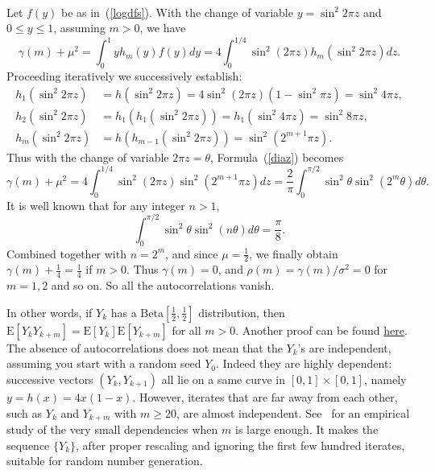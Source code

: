 \documentclass[oneside,10pt]{book}
\newenvironment{proof}[1][Proof]{\begin{trivlist}
\item[\hskip \labelsep {\bfseries #1}]}{\end{trivlist}}
\newcommand{\qed}{\nobreak \ifvmode \relax \else
      \ifdim\lastskip<1.5em \hskip-\lastskip
      \hskip1.5em plus0em minus0.5em \fi \nobreak
      \vrule height0.75em width0.5em depth0.25em\fi}
\begin{document}
\begin{proof} 
\quad \\
Let $f(y)$ be as in~(\ref{logdfs}). With the change of variable $y=\sin^2 2\pi z$ and $0\leq y\leq 1$, assuming $m>0$, we have
\begin{equation}
\gamma(m)+\mu^2 = \int_0^1 y h_m(y) f(y) dy = 4 \int_0^{1/4} \sin^2 (2\pi z) h_m(\sin^2 2\pi z) dz.\label{diaz}
\end{equation}
Proceeding iteratively we successively establish:
\begin{align}
h_1(\sin^2 2\pi z) & = h(\sin^2 2\pi z) = 4 \sin^2 (2\pi z) (1- \sin^2 \pi z) = \sin^2 4\pi z, \nonumber \\
h_2(\sin^2 2\pi z) & = h_1(h_1(\sin^2 2\pi z)) = h_1(\sin^2 4\pi z)= \sin^2 8\pi z, \nonumber \\
h_m(\sin^2 2\pi z) & = h(h_{m-1}(\sin^2 2\pi z)) = \sin^2(2^{m+1}\pi z). \nonumber
\end{align}
Thus with the change of variable $2\pi z=\theta$, Formula~(\ref{diaz}) becomes
$$
\gamma(m)+\mu^2 = 4 \int_0^{1/4} \sin^2 (2\pi z)\sin^2 (2^{m+1}\pi z)dz = \frac{2}{\pi}\int_0^{\pi/2}\sin^2\theta \sin^2 (2^m\theta)d\theta.
$$
It is well known that for any integer $n>1$, 
$$
\int_0^{\pi/2} \sin^2\theta \sin^2 (n \theta)d\theta =\frac{\pi}{8}.
$$
Combined together with $n=2^m$, and since $\mu=\frac{1}{2}$, we finally obtain
$\gamma(m)+\frac{1}{4} = \frac{1}{4}$ if $m>0$. Thus $\gamma(m)=0$, and $\rho(m)=\gamma(m)/\sigma^2=0$ for $m=1,2$ and so on. So all the autocorrelations vanish.
\qed
\end{proof}

In other words, if $Y_k$ has a $\text{Beta}[\frac{1}{2}, \frac{1}{2}]$ distribution, then $\text{E}[Y_k Y_{k+m}]=\text{E}[Y_k]\text{E}[Y_{k+m}]$ for all $m>0$. Another proof can be found \href{https://stats.stackexchange.com/questions/608109/autocorrelation-function-of-the-logistic-map-x-n1-4x-n1-x-n/}{here}.
The absence of autocorrelations does not mean that the $Y_k$'s are independent, assuming you start with a random seed $Y_0$.
 Indeed they are highly dependent: successive vectors $(Y_k,Y_{k+1})$ all lie on a same curve in $[0, 1]\times [0, 1]$, namely
 $y=h(x)= 4x(1-x)$. However, iterates that are far away from each other, such as $Y_k$ and $Y_{k+m}$ 
 with $m\geq 20$, are almost independent. See~\cite{cryptods2020} for an empirical study of the very small dependencies when $m$ is large
 enough. It makes the sequence $\{Y_k\}$, after proper rescaling and ignoring the first few hundred iterates, suitable for 
\textcolor{index}{random number generation}. 
\end{document}

